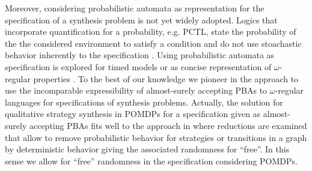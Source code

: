 Moreover, considering probabilistic automata as representation for the
specification of a synthesis problem is not yet widely adopted. Logics that
incorporate quantification for a probability, e.g. \textsc{PCTL}, state the
probability of the the considered environment to satisfy a condition and do not
use stoachastic behavior inherently to the specification \cite{PrinciplesOfMC}.
Using probabilistic automata as specification is explored for timed models
\cite{VerificationAndControl} or as concise representation of $\omega$-regular
properties \cite{PBAforLTLSafety}. To the best of our knowledge we pioneer in
the approach to use the incomparable expressibility of almost-surely accepting
\aclp*{PBA} to $\omega$-regular languages for specifications of synthesis
problems. Actually, the solution for qualitative strategy synthesis in
\aclp*{POMDP} for a specification given as almost-surely accepting \aclp*{PBA}
fits well to the approach in \cite{RandomnessForFree} where reductions are
examined that allow to remove probabilistic behavior for strategies or
transitions in a graph by deterministic behavior giving the associated
randomness for \enquote{free}. In this sense we allow for \enquote{free}
randomness in the specification considering \aclp*{POMDP}.

